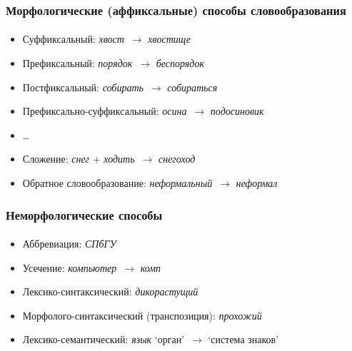 \begin{frame}
    \frametitle{Морфологические (аффиксальные) способы словообразования}
    \framesubtitle{\autocite[122--131]{zubova_menshikova:2014}}

    \begin{itemize}
        \item Суффиксальный: \textit{хвост}~$\rightarrow$ \textit{хвостище}
        \item Префиксальный: \textit{порядок}~$\rightarrow$ \textit{беспорядок}
        \item Постфиксальный: \textit{собирать}~$\rightarrow$ \textit{собираться}
        \item Префиксально-суффиксальный: \textit{осина}~$\rightarrow$ \textit{подосиновик}
        \item \ldots
        \item Сложение: \textit{снег} $+$ \textit{ходить}~$\rightarrow$ \textit{снегоход}
        \item Обратное словообразование: \textit{неформальный}~$\rightarrow$ \textit{неформал}
    \end{itemize}
\end{frame}

\begin{frame}
    \frametitle{Неморфологические способы}
    \framesubtitle{\autocite[131--136]{zubova_menshikova:2014}}

    \begin{itemize}
        \item Аббревиация: \textit{СПбГУ}
        \item Усечение: \textit{компьютер}~$\rightarrow$ \textit{комп}
        \item Лексико-синтаксический: \textit{дикорастущий}
        \item Морфолого-синтаксический (транспозиция): \textit{прохожий}
        \item Лексико-семантический: \textit{язык} `орган'~$\rightarrow$ `система знаков'
    \end{itemize}
\end{frame}

